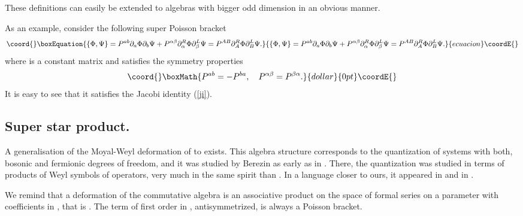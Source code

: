 \documentclass[a4paper,12pt]{article}
\begin{document}
 These definitions can easily be extended to algebras with bigger
odd dimension in an obvious manner.

\bigskip

As an example, consider the following super Poisson bracket
\begin{equation}\coord{}\boxEquation{
\{\Phi,\Psi\}=P^{ab}\partial_a\Phi\partial_b\Psi +
P^{\alpha \beta}\partial^R_\alpha\Phi\partial^L_\beta\Psi=
P^{AB}\partial^R_A\Phi\partial^L_B\Psi. 
\label{spb}
}{
\{\Phi,\Psi\}=P^{ab}\partial_a\Phi\partial_b\Psi +
P^{\alpha \beta}\partial^R_\alpha\Phi\partial^L_\beta\Psi=
P^{AB}\partial^R_A\Phi\partial^L_B\Psi. 
}{ecuacion}\coordE{}\end{equation}
where  \coordHE{} is a  constant matrix and satisfies the symmetry properties
$$\coord{}\boxMath{
P^{ab}=-P^{ba},\quad P^{\alpha\beta}=P^{\beta\alpha}.
}{dollar}{0pt}\coordE{}$$
It is easy to see that it satisfies the Jacobi identity (\ref{ji}).

\subsection{Super star product.}
A generalisation of the Moyal-Weyl \cite{m} deformation of
\coordHE{} to \coordHE{} exists. This algebra structure
corresponds to the quantization of systems with both, bosonic and
fermionic degrees of freedom, and it was studied by Berezin
 as early as  in \cite{be}. There, the quantization was studied in
 terms of products of Weyl  symbols of
operators, very much in the same spirit than \cite{m}. In a language closer to
ours, it appeared  in  \cite{bf} and   in \cite{fza, fl}.

 We remind that a deformation of the commutative algebra \coordHE{}
is an associative
product on the space of formal series on a parameter \coordHE{} with coefficients
in
\coordHE{}, that is
\coordHE{}. The term of first
order in \coordHE{}, antisymmetrized, is always a Poisson bracket.
\end{document}
